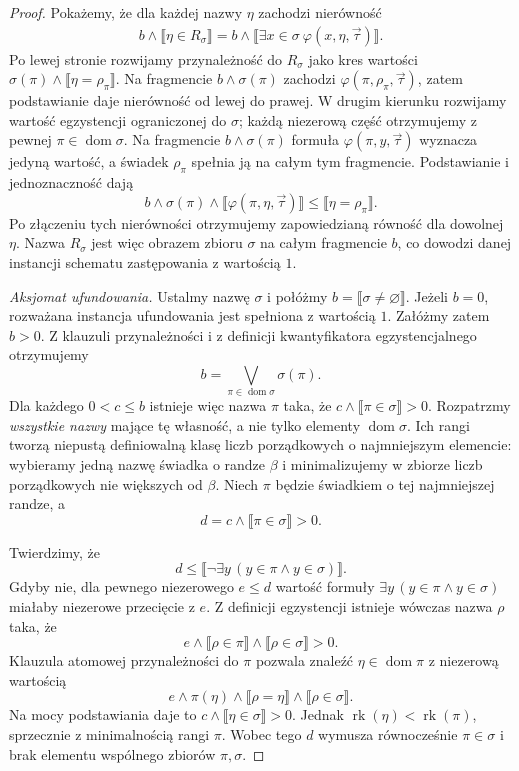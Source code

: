 \begin{proof}
Pokażemy, że dla każdej nazwy
$\eta$ zachodzi nierówność
\[
\begin{split}
 b\wedge\llbracket\eta\in R_\sigma\rrbracket
 =b\wedge\llbracket
    \exists x\in\sigma\
          \varphi(x,\eta,\vec\tau)
               \rrbracket.
\end{split}
\]
Po lewej stronie rozwijamy
przynależność do $R_\sigma$
jako kres wartości
$\sigma(\pi)\wedge
 \llbracket\eta=\rho_\pi\rrbracket$.
Na fragmencie
$b\wedge\sigma(\pi)$ zachodzi
$\varphi(\pi,\rho_\pi,\vec\tau)$,
zatem podstawianie daje
nierówność od lewej do prawej.
W drugim kierunku rozwijamy
wartość egzystencji ograniczonej
do $\sigma$; każdą niezerową
część otrzymujemy z pewnej
$\pi\in\operatorname{dom}\sigma$.
Na fragmencie $b\wedge\sigma(\pi)$
formuła $\varphi(\pi,y,\vec\tau)$
wyznacza jedyną wartość,
a świadek $\rho_\pi$ spełnia
ją na całym tym fragmencie.
Podstawianie i jednoznaczność
dają
\[
 b\wedge\sigma(\pi)\wedge
 \llbracket\varphi(\pi,\eta,\vec\tau)\rrbracket
 \le\llbracket\eta=\rho_\pi\rrbracket.
\]
Po złączeniu tych nierówności
otrzymujemy zapowiedzianą
równość dla dowolnej $\eta$.
Nazwa $R_\sigma$ jest więc
obrazem zbioru $\sigma$
na całym fragmencie $b$,
co dowodzi danej instancji
schematu zastępowania z
wartością $1$.

\emph{Aksjomat ufundowania.}
Ustalmy nazwę $\sigma$ i połóżmy
$b=\llbracket\sigma\ne\varnothing\rrbracket$.
Jeżeli $b=0$, rozważana instancja
ufundowania jest spełniona z wartością
$1$. Załóżmy zatem $b>0$.
Z klauzuli przynależności i z
definicji kwantyfikatora egzystencjalnego
otrzymujemy
\[
 b=\bigvee_{\pi\in\operatorname{dom}\sigma}
                \sigma(\pi).
\]
Dla każdego $0<c\le b$ istnieje
więc nazwa $\pi$ taka, że
$c\wedge\llbracket\pi\in\sigma\rrbracket>0$.
Rozpatrzmy \emph{wszystkie nazwy}
mające tę własność, a nie tylko
elementy $\operatorname{dom}\sigma$.
Ich rangi tworzą niepustą
definiowalną klasę liczb porządkowych
o najmniejszym elemencie: wybieramy
jedną nazwę świadka o randze $\beta$
i minimalizujemy w zbiorze
liczb porządkowych nie większych
od $\beta$. Niech $\pi$ będzie
świadkiem o tej najmniejszej randze,
a
\[
 d=c\wedge\llbracket\pi\in\sigma\rrbracket>0.
\]

Twierdzimy, że
\[
 d\le\llbracket
   \neg\exists y\,
      (y\in\pi\land y\in\sigma)
             \rrbracket.
\]
Gdyby nie, dla pewnego niezerowego
$e\le d$ wartość formuły
$\exists y\,(y\in\pi\land y\in\sigma)$
miałaby niezerowe przecięcie z $e$.
Z definicji egzystencji istnieje
wówczas nazwa $\rho$ taka, że
\[
 e\wedge\llbracket\rho\in\pi\rrbracket
   \wedge\llbracket\rho\in\sigma\rrbracket>0.
\]
Klauzula atomowej przynależności
do $\pi$ pozwala znaleźć
$\eta\in\operatorname{dom}\pi$
z niezerową wartością
\[
 e\wedge\pi(\eta)
 \wedge\llbracket\rho=\eta\rrbracket
 \wedge\llbracket\rho\in\sigma\rrbracket.
\]
Na mocy podstawiania daje to
$c\wedge\llbracket\eta\in\sigma\rrbracket>0$.
Jednak $\operatorname{rk}(\eta)<
\operatorname{rk}(\pi)$, sprzecznie
z minimalnością rangi $\pi$.
Wobec tego $d$ wymusza równocześnie
$\pi\in\sigma$ i brak elementu
wspólnego zbiorów $\pi,\sigma$.


\end{proof}
